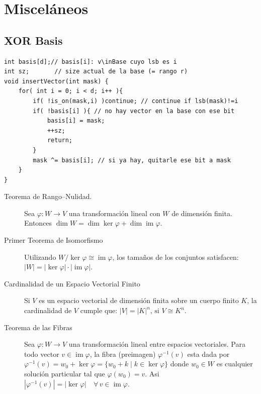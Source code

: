 \section{Misceláneos}
\subsection{XOR Basis}


\begin{verbatim}
int basis[d];// basis[i]: v\inBase cuyo lsb es i
int sz;       // size actual de la base (= rango r)
void insertVector(int mask) {
    for( int i = 0; i < d; i++ ){
        if( !is_on(mask,i) )continue; // continue if lsb(mask)!=i
        if( !basis[i] ){ // no hay vector en la base con ese bit
            basis[i] = mask;
            ++sz;
            return;
        }
        mask ^= basis[i]; // si ya hay, quitarle ese bit a mask
    }
}
\end{verbatim}
\begin{extended}[] \vspace{-2mm}
\begin{description}
\item[Teorema de Rango--Nulidad.] 
Sea $\varphi:W\to V$ una transformación lineal con $W$ de dimensión finita. Entonces
$
\dim W=\dim\ker \varphi+\dim\operatorname{im}\varphi.
$

\item[Primer Teorema de Isomorfismo]
Utilizando $W / \ker \varphi \cong \operatorname{im}\varphi$, los tamaños de los conjuntos satisfacen:
$
|W| = |\ker \varphi| \cdot |\operatorname{im} \varphi|.
$
\item[Cardinalidad de un Espacio Vectorial Finito]
Si $V$ es un espacio vectorial de dimensión finita sobre un cuerpo finito $K$, la cardinalidad de $V$ cumple que:
$
|V| = |K|^{n} \text{, si } V \cong K^n.
$

\item[Teorema de las Fibras]
Sea $\varphi: W \to V$ una transformación lineal entre espacios vectoriales. Para todo vector $v \in \operatorname{im}\varphi$, la fibra (preimagen) $\varphi^{-1}(v)$ esta dada por
$
\varphi^{-1}(v) = w_0 + \ker \varphi = \{ w_0 + k \mid k \in \ker \varphi \}
$
donde $w_0 \in W$ es cualquier solución particular tal que $\varphi(w_0) = v$. Asi
$
|\varphi^{-1}(v)| = |\ker \varphi| \quad \forall \, v \in \operatorname{im}\varphi.
$
\end{description}
\end{extended}


